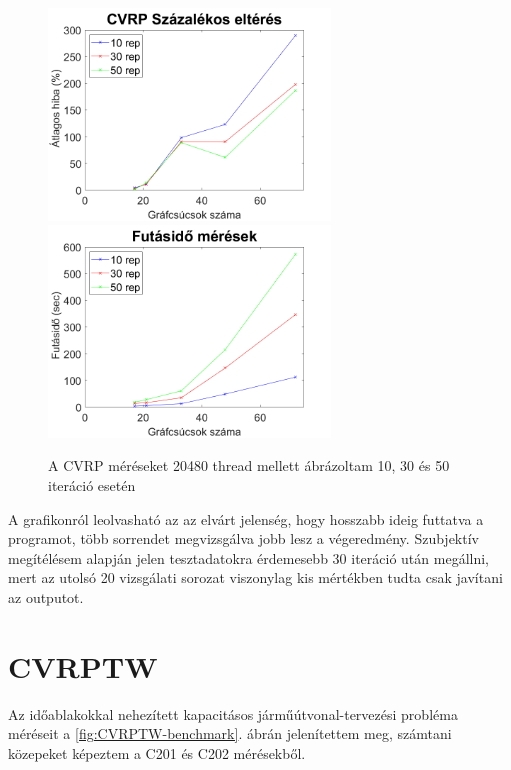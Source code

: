 \begin{figure}[ht!]
	\includegraphics[width=75mm, keepaspectratio]{figures/CVRP-benchmark-error.png}
	\includegraphics[width=75mm, keepaspectratio]{figures/CVRP-benchmark-time.png}
	\caption{A CVRP méréseket 20480 thread mellett ábrázoltam 10, 30 és 50 iteráció esetén}
	\label{fig:CVRP-benchmark}
\end{figure}

A grafikonról leolvasható az az elvárt jelenség, hogy hosszabb ideig futtatva a programot, több sorrendet megvizsgálva jobb lesz a végeredmény. Szubjektív megítélésem alapján jelen tesztadatokra érdemesebb 30 iteráció után megállni, mert az utolsó 20 vizsgálati sorozat viszonylag kis mértékben tudta csak javítani az outputot. 

\section{CVRPTW}
Az időablakokkal nehezített kapacitásos járműútvonal-tervezési probléma méréseit a \ref{fig:CVRPTW-benchmark}. ábrán jelenítettem meg, számtani közepeket képeztem a C201 és C202 mérésekből.

